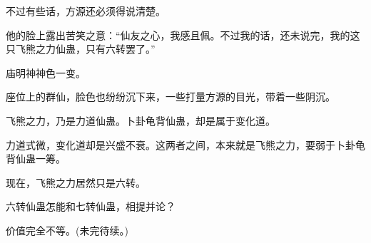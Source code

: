 \begin{this_body}
不过有些话，方源还必须得说清楚。

他的脸上露出苦笑之意：“仙友之心，我感且佩。不过我的话，还未说完，我的这只飞熊之力仙蛊，只有六转罢了。”

庙明神神色一变。

座位上的群仙，脸色也纷纷沉下来，一些打量方源的目光，带着一些阴沉。

飞熊之力，乃是力道仙蛊。卜卦龟背仙蛊，却是属于变化道。

力道式微，变化道却是兴盛不衰。这两者之间，本来就是飞熊之力，要弱于卜卦龟背仙蛊一筹。

现在，飞熊之力居然只是六转。

六转仙蛊怎能和七转仙蛊，相提并论？

价值完全不等。(未完待续。)

\end{this_body}

